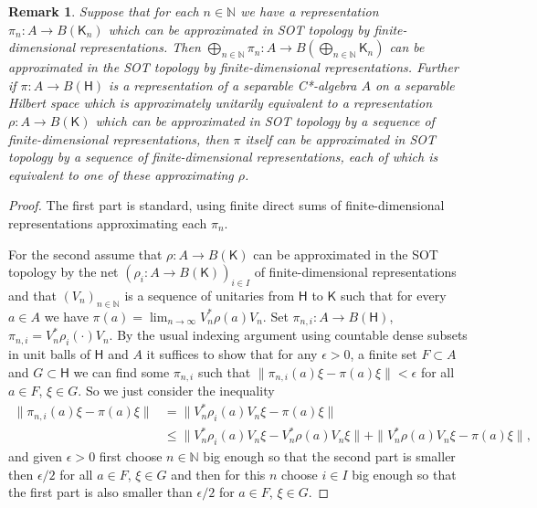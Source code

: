\documentclass[11 pt, leqno, hidelinks]{amsart}%
\theoremstyle{plain}
\newtheorem{remark}[theorem]{Remark}
\numberwithin{equation}{section}
\newcommand{\N}{\mathbb{N}}
\newcommand{\Hil}{\mathsf{H}}
\newcommand{\Kil}{\mathsf{K}}
\begin{document}
\begin{remark}\label{remark:afd}
	Suppose that for each $n \in \N$ we have a representation $\pi_n:A\to B(\Kil_n)$ which can be approximated in SOT topology by finite-dimensional representations. Then $\bigoplus_{n \in \N} \pi_n:A \to B(\bigoplus_{n \in \N} \Kil_n)$ can be approximated in the SOT topology by finite-dimensional representations. Further if $\pi:A \to B(\Hil)$ is a representation of a separable C*-algebra $A$ on a separable Hilbert space which is approximately unitarily equivalent to a representation $\rho:A \to B(\Kil)$ which can be approximated in SOT topology by a sequence of finite-dimensional representations, then $\pi$ itself can be approximated in SOT topology by a sequence of  finite-dimensional representations, each of which is equivalent to one of these approximating $\rho$.
\end{remark}
\begin{proof}
	The first part is standard, using finite direct sums of finite-dimensional representations approximating each $\pi_n$.
	
	For the second assume  that $\rho:A \to B(\Kil)$ can be approximated in the SOT topology by the net $(\rho_i:A \to B(\Kil))_{i \in I}$ of finite-dimensional representations and  that $(V_n)_{n \in \N}$ is a sequence of unitaries from $\Hil$ to $\Kil$ such that for every $a \in A$ we have $\pi(a) = \lim_{n \to \infty} V_n^* \rho(a) V_n$. Set $\pi_{n,i}:A \to B(\Hil)$, $\pi_{n,i} = V_n^* \rho_i(\cdot) V_n$.
	By the usual indexing argument using countable dense subsets in unit balls of $\Hil$ and $A$ it suffices to show that for any $\epsilon>0$, a finite set $F\subset A$  and $ G \subset \Hil$ we can find some $\pi_{n,i}$ such that $ \|\pi_{n,i}(a) \xi - \pi(a)\xi\| < \epsilon$ for all $a \in F$, $\xi \in G$. So we just consider the inequality
	\begin{align*} \|\pi_{n,i}(a) \xi - \pi(a)\xi\| &=  \| V_n^* \rho_i(a) V_n \xi - \pi(a)\xi \|\\&\leq
	\| V_n^* \rho_i(a) V_n \xi - V_n^* \rho(a) V_n \xi\| + \| V_n^* \rho(a) V_n \xi-  \pi(a)\xi \|,	
	\end{align*}
	and given $\epsilon>0$ first choose $n\in \N$ big enough so that the second part is smaller then $\epsilon/2$ for all $a \in F$, $\xi \in G$ and then for this $n$ choose $i\in I$ big enough so that the first part is also smaller than $\epsilon/2$ for $a \in F$, $\xi \in G$.
\end{proof}

\end{document}

